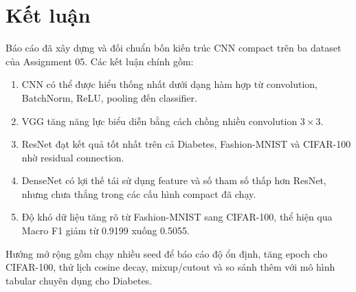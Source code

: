 \documentclass[12pt,a4paper]{report}
\begin{document}
\section{Kết luận}
Báo cáo đã xây dựng và đối chuẩn bốn kiến trúc CNN compact trên ba dataset của Assignment 05.
Các kết luận chính gồm:
\begin{enumerate}
    \item CNN có thể được hiểu thống nhất dưới dạng hàm hợp từ convolution, BatchNorm, ReLU, pooling đến classifier.
    \item VGG tăng năng lực biểu diễn bằng cách chồng nhiều convolution $3\times3$.
    \item ResNet đạt kết quả tốt nhất trên cả Diabetes, Fashion-MNIST và CIFAR-100 nhờ residual connection.
    \item DenseNet có lợi thế tái sử dụng feature và số tham số thấp hơn ResNet, nhưng chưa thắng trong các cấu hình compact đã chạy.
    \item Độ khó dữ liệu tăng rõ từ Fashion-MNIST sang CIFAR-100, thể hiện qua Macro F1 giảm từ 0.9199 xuống 0.5055.
\end{enumerate}

Hướng mở rộng gồm chạy nhiều seed để báo cáo độ ổn định, tăng epoch cho CIFAR-100, thử lịch cosine decay, mixup/cutout và so sánh thêm với mô hình tabular chuyên dụng cho Diabetes.
\end{document}
